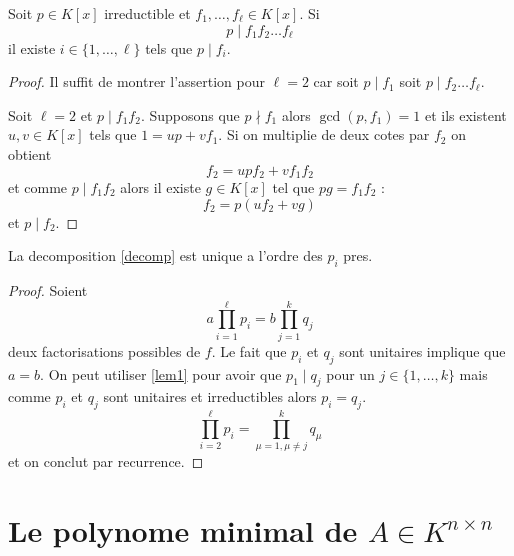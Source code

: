 \begin{lemma}\label{lem1}
Soit $p \in K[x]$ irreductible et $f_{1},\dots,f_{\ell}\in K[x]$. Si 
$$
p\mid f_{1}f_{2}\dots f_{\ell}
$$
il existe $i\in \{ 1,\dots,\ell \}$ tels que $p\mid f_{i}$.
\end{lemma}
\begin{proof}
Il suffit de montrer l'assertion pour $\ell=2$ car soit $p\mid f_{1}$ soit $p\mid f_{2}\dots f_{\ell}$. 

Soit $\ell=2$ et $p\mid f_{1}f_{2}$. Supposons que $p\nmid f_{1}$ alors $\gcd(p,f_{1})=1$ et ils existent $u,v\in K[x]$ tels que $1=up+vf_{1}$. Si on multiplie de deux cotes par $f_{2}$ on obtient
$$
f_{2}=upf_{2}+vf_{1}f_{2}
$$
et comme $p\mid f_{1}f_{2}$ alors il existe $g\in K[x]$ tel que $pg=f_{1}f_{2}$ :
$$
f_{2}=p(uf_{2}+vg)
$$
et $p\mid f_{2}$.
\end{proof}
\begin{theorem}
La decomposition \ref{decomp} est unique a l'ordre des $p_{i}$ pres.
\end{theorem}
\begin{proof}
Soient
$$
a\prod_{i=1}^{\ell} p_{i}=b\prod_{j=1}^{k} q_{j}
$$
deux factorisations possibles de $f$. Le fait que $p_{i}$ et $q_{j}$ sont unitaires implique que $a=b$. On peut utiliser \ref{lem1} pour avoir que $p_1\mid q_{j}$ pour un $j\in \{ 1,\dots ,k \}$ mais comme $p_{i}$ et $q_{j}$ sont unitaires et irreductibles alors $p_{i}=q_{j}$.
$$
\prod_{i=2}^{\ell} p_{i}=\prod_{\mu=1,\mu\neq j}^{k} q_{\mu}
$$
et on conclut par recurrence.
\end{proof}

\section{Le polynome minimal de \texorpdfstring{$A\in K^{n\times n}$}{A}}

